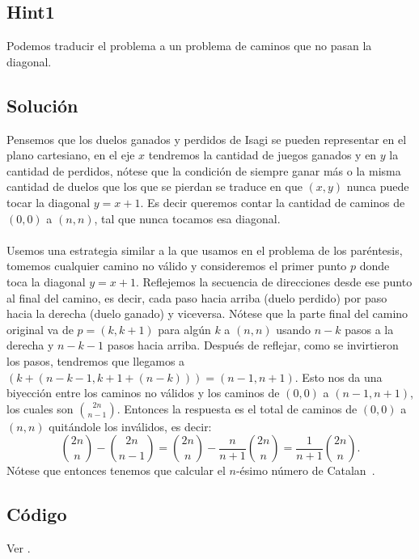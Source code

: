 \subsection*{Hint1}
Podemos traducir el problema a un problema de caminos que no pasan la diagonal.
\subsection*{Solución}
Pensemos que los duelos ganados y perdidos de Isagi se pueden representar en el plano cartesiano, en el eje $x$ tendremos la cantidad de juegos ganados y en $y$ la cantidad de perdidos, nótese que la condición de siempre ganar más o la misma cantidad de duelos que los que se pierdan se traduce en que $(x,y)$ nunca puede tocar la diagonal $y=x+1$. Es decir queremos contar la cantidad de caminos de $(0,0)$ a $(n,n)$, tal que nunca tocamos esa diagonal.
\\\\
Usemos una estrategia similar a la que usamos en el problema de los paréntesis, tomemos cualquier camino no válido y consideremos el primer punto $p$ donde toca la diagonal $y=x+1$. Reflejemos la secuencia de direcciones desde ese punto al final del camino, es decir, cada paso hacia arriba (duelo perdido) por paso hacia la derecha (duelo ganado) y viceversa. Nótese que la parte final del camino original va de $p=(k,k+1)$ para algún $k$ a $(n,n)$ usando $n-k$ pasos a la derecha y $n-k-1$ pasos hacia arriba. Después de reflejar, como se invirtieron los pasos, tendremos que llegamos a $(k+(n-k-1,k+1+(n-k)))=(n-1,n+1)$. Esto nos da una biyección entre los caminos no válidos y los caminos de $(0,0)$ a $(n-1,n+1)$, los cuales son $\binom{2n}{n-1}$. Entonces la respuesta es el total de caminos de $(0,0)$ a $(n,n)$ quitándole los inválidos, es decir:
\[\binom{2n}{n}-\binom{2n}{n-1}=\binom{2n}{n}-\frac{n}{n+1}\binom{2n}{n}=\frac{1}{n+1}\binom{2n}{n}.\]
Nótese que entonces tenemos que calcular el $n$-ésimo número de Catalan~\cite{cf_catalan}.
\subsection*{Código}
Ver .

